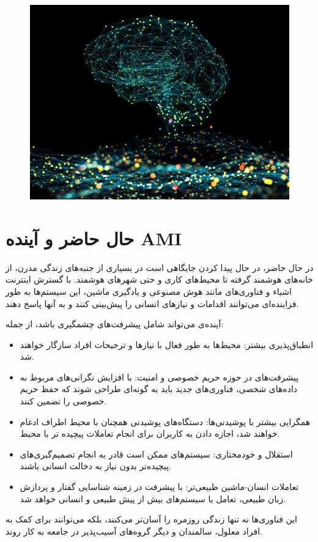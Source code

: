 \begin{figure}[H]
	\centering
	\includegraphics{pic2.jpg}
	\label{fig:label4}
\end{figure}

\section*{حال حاضر و آینده AMI}
در حال حاضر،
در حال پیدا کردن جایگاهی است در بسیاری از جنبه‌های زندگی مدرن، از خانه‌های هوشمند گرفته تا محیط‌های کاری و حتی شهرهای هوشمند. با گسترش اینترنت اشیاء 
و فناوری‌های مانند هوش مصنوعی و یادگیری ماشین، این سیستم‌ها به طور فزاینده‌ای می‌توانند اقدامات و نیازهای انسانی را پیش‌بینی کنند و به آنها پاسخ دهند.

آینده‌ی
می‌تواند شامل پیشرفت‌های چشمگیری باشد، از جمله:
\begin{itemize}
	\item انطباق‌پذیری بیشتر: محیط‌ها به طور فعال با نیازها و ترجیحات افراد سازگار خواهند شد.
	\item پیشرفت‌های در حوزه حریم خصوصی و امنیت: با افزایش نگرانی‌های مربوط به داده‌های شخصی، فناوری‌های جدید باید به گونه‌ای طراحی شوند که حفظ حریم خصوصی را تضمین کنند.
	\item همگرایی بیشتر با پوشیدنی‌ها: دستگاه‌های پوشیدنی همچنان با محیط اطراف ادغام خواهند شد، اجازه دادن به کاربران برای انجام تعاملات پیچیده تر با محیط.
	\item استقلال و خودمختاری: سیستم‌های  ممکن است قادر به انجام تصمیم‌گیری‌های پیچیده‌تر بدون نیاز به دخالت انسانی باشند.
	\item تعاملات انسان-ماشین طبیعی‌تر: با پیشرفت در زمینه شناسایی گفتار و پردازش زبان طبیعی، تعامل با سیستم‌های  بیش از پیش طبیعی و انسانی خواهد شد.
\end{itemize}
این فناوری‌ها نه تنها زندگی روزمره را آسان‌تر می‌کنند، بلکه می‌توانند برای کمک به افراد معلول، سالمندان و دیگر گروه‌های آسیب‌پذیر در جامعه به کار روند.
